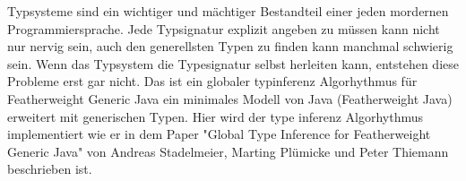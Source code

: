Typsysteme sind ein wichtiger und mächtiger Bestandteil einer jeden mordernen Programmiersprache.
Jede Typsignatur explizit angeben zu müssen kann nicht nur nervig sein, auch den generellsten Typen zu finden kann manchmal schwierig sein.
Wenn das Typsystem die Typesignatur selbst herleiten kann, entstehen diese Probleme erst gar nicht.
Das ist ein globaler typinferenz Algorhythmus für Featherweight Generic Java ein minimales Modell von Java (Featherweight Java) erweitert mit generischen Typen.
Hier wird der type inferenz Algorhythmus implementiert wie er in dem Paper "Global Type Inference for Featherweight Generic Java" von Andreas Stadelmeier, Marting Plümicke und Peter Thiemann beschrieben ist.
